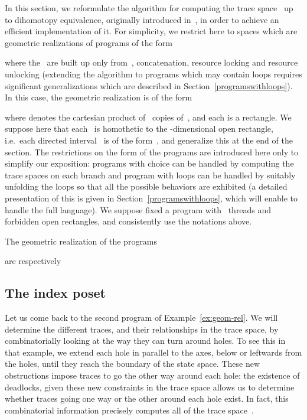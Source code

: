 \documentclass[orivec]{llncs} \usepackage[T1]{fontenc}
\newcommand{\nbd}{\nobreakdash-\hspace{0pt}}
\newcommand{\ie}{i.e.~}
\begin{document}
In this section, we reformulate the algorithm for computing the trace
space~\hbox{} up to dihomotopy equivalence, originally introduced
in~\cite{raussen2010simplicial}, in order to achieve an efficient implementation
of it. For simplicity, we restrict here to spaces which are geometric
realizations of programs of the form

where the~ are built up only from~, concatenation, resource locking
and resource unlocking (extending the algorithm to programs which may contain
loops requires significant generalizations which are described in
Section~\ref{programswithloops}). In this case, the geometric realization is of
the form
\vspace{-2ex}

where  denotes the cartesian product of~ copies of~, and each
\hbox{} is a rectangle. We suppose here that
each~ is homothetic to the \nbd{}dimensional open rectangle, \ie each
directed interval~ is of the form~, and
generalize this at the end of the section. The restrictions on the form of the
programs are introduced here only to simplify our exposition: programs with
choice can be handled by computing the trace spaces on each branch and program
with loops can be handled by suitably unfolding the loops so that all the
possible behaviors are exhibited (a detailed presentation of this is given in
Section~\ref{programswithloops}, which will enable to handle the full
language). We suppose fixed a program with~ threads and~ forbidden open
rectangles, and consistently use the notations above.

\begin{example}
  \label{ex:geom-rel}
  The geometric realization of the programs
  
  are respectively
  \vspace{-4ex}
  
\end{example}

\subsection{The index poset}
\label{indexposet}
Let us come back to the second program of Example~\ref{ex:geom-rel}.  We will
determine the different traces, and their relationships in the trace space, by
combinatorially looking at the way they can turn around holes. To see this in
that example, we extend each hole in parallel to the axes, below or leftwards
from the holes, until they reach the boundary of the state space. These new
obstructions impose traces to go the other way around each hole: the existence
of deadlocks, given these new constraints in the trace space allows us to
determine whether traces going one way or the other around each hole exist. In
fact, this combinatorial information precisely computes all of the trace
space~\cite{raussen2010simplicial}.
\end{document}
